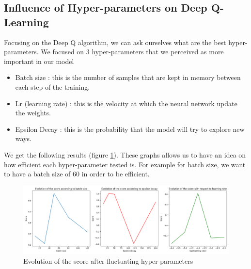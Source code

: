 \documentclass[11pt,a4paper]{article}
\newcounter{fig}
\newcommand{\mlist}[1]{\begin{itemize}[noitemsep,topsep=0pt]#1\end{itemize}}
\begin{document}
        
		\subsection*{Influence of Hyper-parameters on Deep Q-Learning}
Focusing on the Deep Q algorithm, we can ask ourselves what are the best hyper-parameters. We focused on $3$ hyper-parameters that we perceived as more important in our model
\mlist{
\item Batch size : this is the number of samples that are kept in memory between each step of the training. 
\item Lr (learning rate) : this is the velocity at which the neural network update the weights. 
\item Epsilon Decay : this is the probability that the model will try to explore new ways. 
}
We get the following results (figure \ref{figure:Evolution of score depending of hyper-parameter}). These graphs allows us to have an idea on how efficient each hyper-parameter tested is. For example for batch size, we want to have a batch size of $60$ in order to be efficient.
        \begin{figure}[ht]
            \centering
            \includegraphics[scale = 0.46]{comparaison2.png}
            \caption{Evolution of the score after fluctuating hyper-parameters}
            \label{figure:Evolution of score depending of hyper-parameter}
        \end{figure}
        
        
        
\end{document}
